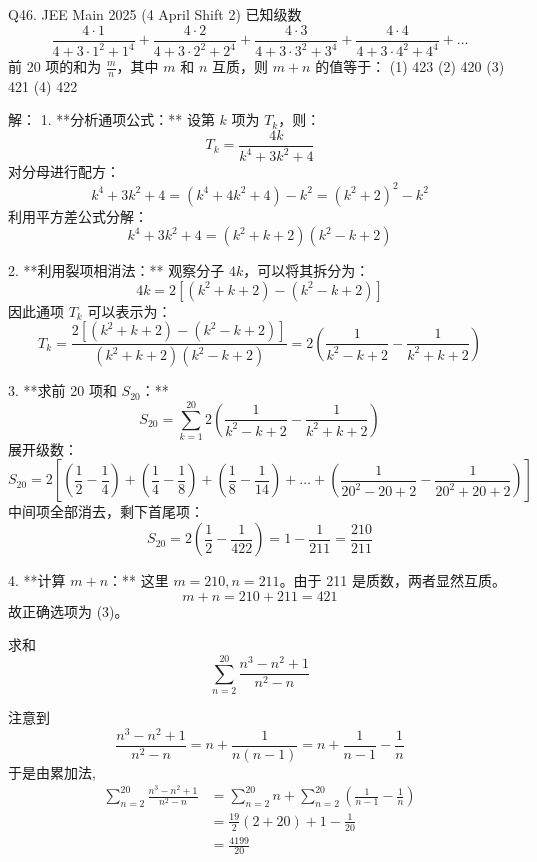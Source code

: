 \begin{questions}
    \question Q46. JEE Main 2025 (4 April Shift 2)
已知级数
\[ \frac{4 \cdot 1}{4 + 3 \cdot 1^2 + 1^4} + \frac{4 \cdot 2}{4 + 3 \cdot 2^2 + 2^4} + \frac{4 \cdot 3}{4 + 3 \cdot 3^2 + 3^4} + \frac{4 \cdot 4}{4 + 3 \cdot 4^2 + 4^4} + \dots \]
前 20 项的和为 $\frac{m}{n}$，其中 $m$ 和 $n$ 互质，则 $m + n$ 的值等于：
(1) 423 \quad (2) 420 \quad (3) 421 \quad (4) 422

\begin{solution}
解：
1. **分析通项公式：**
设第 $k$ 项为 $T_k$，则：
\[ T_k = \frac{4k}{k^4 + 3k^2 + 4} \]
对分母进行配方：
\[ k^4 + 3k^2 + 4 = (k^4 + 4k^2 + 4) - k^2 = (k^2 + 2)^2 - k^2 \]
利用平方差公式分解：
\[ k^4 + 3k^2 + 4 = (k^2 + k + 2)(k^2 - k + 2) \]

2. **利用裂项相消法：**
观察分子 $4k$，可以将其拆分为：
\[ 4k = 2[(k^2 + k + 2) - (k^2 - k + 2)] \]
因此通项 $T_k$ 可以表示为：
\[ T_k = \frac{2[(k^2 + k + 2) - (k^2 - k + 2)]}{(k^2 + k + 2)(k^2 - k + 2)} = 2 \left( \frac{1}{k^2 - k + 2} - \frac{1}{k^2 + k + 2} \right) \]

3. **求前 20 项和 $S_{20}$：**
\[ S_{20} = \sum_{k=1}^{20} 2 \left( \frac{1}{k^2 - k + 2} - \frac{1}{k^2 + k + 2} \right) \]
展开级数：
\[ S_{20} = 2 \left[ \left( \frac{1}{2} - \frac{1}{4} \right) + \left( \frac{1}{4} - \frac{1}{8} \right) + \left( \frac{1}{8} - \frac{1}{14} \right) + \dots + \left( \frac{1}{20^2 - 20 + 2} - \frac{1}{20^2 + 20 + 2} \right) \right] \]
中间项全部消去，剩下首尾项：
\[ S_{20} = 2 \left( \frac{1}{2} - \frac{1}{422} \right) = 1 - \frac{1}{211} = \frac{210}{211} \]

4. **计算 $m+n$：**
这里 $m = 210, n = 211$。由于 211 是质数，两者显然互质。
\[ m + n = 210 + 211 = 421 \]
故正确选项为 (3)。
\end{solution}
    \question 求和
    \[
    \sum_{n=2}^{20} \frac{n^3-n^2+1}{n^2-n}
    \]
    \begin{solution}
        注意到
        \[
        \frac{n^3-n^2+1}{n^2-n} = n + \frac{1}{n(n-1)} = n + \frac{1}{n-1} - \frac{1}{n}
        \]
        于是由累加法,
        \begin{align*}
        \sum_{n=2}^{20} \frac{n^3-n^2+1}{n^2-n}
        &= \sum_{n=2}^{20} n + \sum_{n=2}^{20} \left(\frac{1}{n-1} - \frac{1}{n} \right) \\
        &= \frac{19}{2}(2+20) + 1 - \frac{1}{20} \\
        &= \frac{4199}{20}
        \end{align*}
    \end{solution}


\end{questions}

